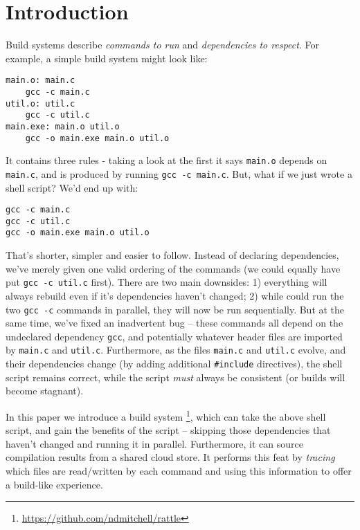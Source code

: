 \section{Introduction}
\label{sec:introduction}

Build systems \citep{build_systems_a_la_carte} describe \emph{commands to run} and \emph{dependencies to respect}. For example, a simple \Make build system might look like:

\vspace{3mm}
\begin{verbatim}
main.o: main.c
    gcc -c main.c
util.o: util.c
    gcc -c util.c
main.exe: main.o util.o
    gcc -o main.exe main.o util.o
\end{verbatim}
\vspace{3mm}

It contains three rules - taking a look at the first it says \texttt{main.o} depends on \texttt{main.c}, and is produced by running \texttt{gcc -c main.c}. But, what if we just wrote a shell script? We'd end up with:

\vspace{3mm}
\begin{verbatim}
gcc -c main.c
gcc -c util.c
gcc -o main.exe main.o util.o
\end{verbatim}
\vspace{3mm}

That's shorter, simpler and easier to follow. Instead of declaring dependencies, we've merely given one valid ordering of the commands (we could equally have put \texttt{gcc -c util.c} first). There are two main downsides: 1) everything will always rebuild even if it's dependencies haven't changed; 2) while \Make could run the two \texttt{gcc -c} commands in parallel, they will now be run sequentially. But at the same time, we've fixed an inadvertent bug -- these commands all depend on the undeclared dependency \texttt{gcc}, and potentially whatever header files are imported by \texttt{main.c} and \texttt{util.c}. Furthermore, as the files \texttt{main.c} and \texttt{util.c} evolve, and their dependencies change (by adding additional \texttt{\#include} directives), the shell script remains correct, while the \Make script \emph{must} always be consistent (or builds will become stagnant).

In this paper we introduce a build system \Rattle\footnote{\url{https://github.com/ndmitchell/rattle}}, which can take the above shell script, and gain the benefits of the \Make script -- skipping those dependencies that haven't changed and running it in parallel. Furthermore, it can source compilation results from a shared cloud store. It performs this feat by \emph{tracing} which files are read/written by each command and using this information to offer a build-like experience.

